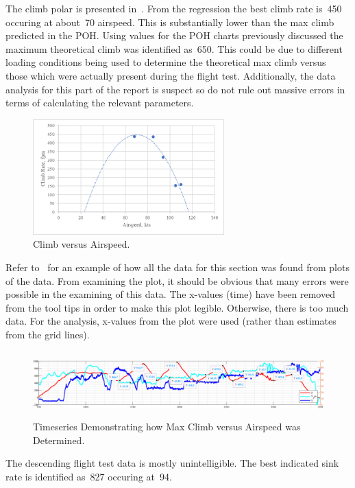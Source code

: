 \documentclass[conf]{new-aiaa}
\begin{document}
The climb polar is presented in~. From the regression the best climb rate is~\SI{450}{\fpm} occuring at about~\SI{70}{\kts} airspeed. This is substantially lower than the max climb predicted in the POH. Using values for the POH charts previously discussed the maximum theoretical climb was identified as~\SI{650}{\kts}. This could be due to different loading conditions being used to determine the theoretical max climb versus those which were actually present during the flight test. Additionally, the data analysis for this part of the report is suspect so do not rule out massive errors in terms of calculating the relevant parameters.

\begin{figure}[htp!]
\centering
	\includegraphics[height=1.75in]{ClimbPolar.png}
	\caption{Climb versus Airspeed.}
	\label{climbpolar}
\end{figure}

Refer to~ for an example of how all the data for this section was found from plots of the data. From examining the plot, it should be obvious that many errors were possible in the examining of this data. The x-values (time) have been removed from the tool tips in order to make this plot legible. Otherwise, there is too much data. For the analysis, x-values from the plot were used (rather than estimates from the grid lines).

\begin{figure}[htp!]
\centering
	\includegraphics[height=1.0in]{Climbing.png}
	\caption{Timeseries Demonstrating how Max Climb versus Airspeed was Determined.}
	\label{climbing}
\end{figure}

The descending flight test data is mostly unintelligible. The best indicated sink rate is identified as~\SI{827}{\fpm} occuring at~\SI{94}{\kts}.
\end{document}
